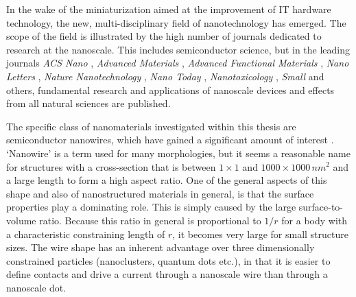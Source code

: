 In the wake of the miniaturization aimed at the improvement of IT hardware technology, the new, multi-disciplinary field of nanotechnology has emerged. The scope of the field is illustrated by the high number of journals dedicated to research at the nanoscale. This includes semiconductor science, but in the leading journals \emph{ACS Nano} \cite{acs_nano_http://pubs.acs.org/journal/ancac3_2015}, \emph{Advanced Materials} \cite{advanced_materials_http://www.advmat./_2015}, \emph{Advanced Functional Materials} \cite{advanced_functional_materials_http://onlinelibrary.wiley.com/journal/10.1002/issn1616-3028_2015}, \emph{Nano Letters} \cite{nano_letters_http://pubs.acs.org/journal/nalefd_2015}, \emph{Nature Nanotechnology} \cite{nature_nanotechnology_http://www.nature.com/nnano_2015}, \emph{Nano Today} \cite{nano_today_http://journals.elsevier.com/17480132/nano-today/_2015}, \emph{Nanotoxicology} \cite{nanotoxicology_http://www.informahealthcare.com/nan_2015}, \emph{Small} \cite{small_http://www.small-journal.com/_2015} and others, fundamental research and applications of nanoscale devices and effects from all natural sciences are published.

The specific class of nanomaterials investigated within this thesis are semiconductor nanowires, which have gained a significant amount of  interest \cite{huang_room-temperature_2001,cui_nanowire_2001,duan_indium_2001,xia_one-dimensional_2003,lieber_functional_2007}. `Nanowire' is a term used for many morphologies, but it seems a reasonable name for structures with a cross-section that is between $1 \times 1$ and $1000 \times 1000\,nm^2$ and a large length to form a high aspect ratio. One of the general aspects of this shape and also of nanostructured materials in general, is that the surface properties play a dominating role. This is simply caused by the large surface-to-volume ratio. Because this ratio in general is proportional to $1/r$ for a body with a characteristic constraining length of $r$, it becomes very large for small structure sizes. The wire shape has an inherent advantage over three dimensionally constrained particles (nanoclusters, quantum dots etc.), in that it is easier to define contacts and drive a current through a nanoscale wire than through a nanoscale dot. 


